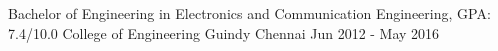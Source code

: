 
\begin{cventries}
  \cveducation
    {Bachelor of Engineering in Electronics and Communication Engineering, GPA: 7.4/10.0} %
    {College of Engineering Guindy} %
    {Chennai} %
    {Jun 2012 - May 2016} %
\end{cventries}
